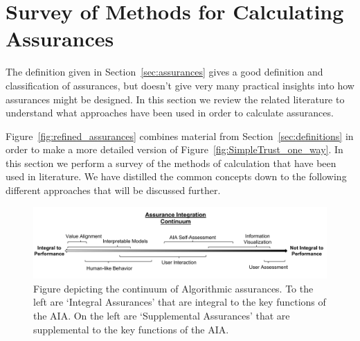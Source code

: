 \section{Survey of Methods for Calculating Assurances} \label{sec:synthesis}
    The definition given in Section~\ref{sec:assurances} gives a good definition and classification of assurances, but doesn't give very many practical insights into how assurances might be designed. In this section we review the related literature to understand what approaches have been used in order to calculate assurances.
    
    Figure~\ref{fig:refined_assurances} combines material from Section~\ref{sec:definitions} in order to make a more detailed version of Figure~\ref{fig:SimpleTrust_one_way}. In this section we perform a survey of the methods of calculation that have been used in literature. We have distilled the common concepts down to the following different approaches that will be discussed further.

    \begin{figure}[htbp]
        \centering
        \includegraphics[width=1.0\textwidth]{Figures/Assurance_Integration.pdf}
        \caption{Figure depicting the continuum of Algorithmic assurances. To the left are `Integral Assurances' that are integral to the key functions of the AIA. On the left are `Supplemental Assurances' that are supplemental to the key functions of the AIA.}
        \label{fig:assurance_continuum}
    \end{figure}









